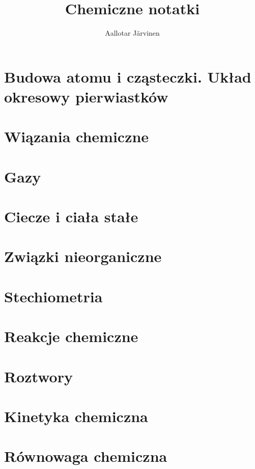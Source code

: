 \documentclass{createspace}
\author{Aallotar Järvinen}
\title{Chemiczne notatki}
\begin{document}





\tableofcontents

\chapter{Budowa atomu i cząsteczki. Układ okresowy pierwiastków}



\chapter{Wiązania chemiczne}

\chapter{Gazy}


\chapter{Ciecze i ciała stałe}


\chapter{Związki nieorganiczne}

\chapter{Stechiometria}

\chapter{Reakcje chemiczne}

\chapter{Roztwory}

\chapter{Kinetyka chemiczna}

\chapter{Równowaga chemiczna}
\end{document}

